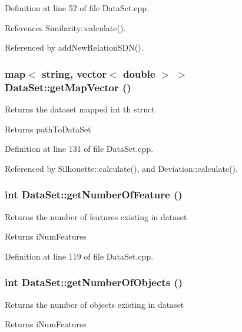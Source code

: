Definition at line 52 of file DataSet.cpp.

References Similarity::calculate().

Referenced by addNewRelationSDN().\hypertarget{classDataSet_ab143b593863e69f9fb13383b2917f6f5}{
\subsubsection[{getMapVector}]{\setlength{\rightskip}{0pt plus 5cm}map$<$ string, vector$<$ double $>$ $>$ DataSet::getMapVector ()}}
\label{classDataSet_ab143b593863e69f9fb13383b2917f6f5}
Returns the dataset mapped int th struct \begin{DoxyReturn}{Returns}
pathToDataSet 
\end{DoxyReturn}


Definition at line 131 of file DataSet.cpp.

Referenced by Silhouette::calculate(), and Deviation::calculate().\hypertarget{classDataSet_af747c49a69d26123a80a2da14eb40e13}{
\subsubsection[{getNumberOfFeature}]{\setlength{\rightskip}{0pt plus 5cm}int DataSet::getNumberOfFeature ()}}
\label{classDataSet_af747c49a69d26123a80a2da14eb40e13}
Returns the number of features existing in dataset \begin{DoxyReturn}{Returns}
iNumFeatures 
\end{DoxyReturn}


Definition at line 119 of file DataSet.cpp.\hypertarget{classDataSet_ad871938d36c8988a8e921788cd0019f7}{
\subsubsection[{getNumberOfObjects}]{\setlength{\rightskip}{0pt plus 5cm}int DataSet::getNumberOfObjects ()}}
\label{classDataSet_ad871938d36c8988a8e921788cd0019f7}
Returns the number of objects existing in dataset \begin{DoxyReturn}{Returns}
iNumFeatures 
\end{DoxyReturn}


